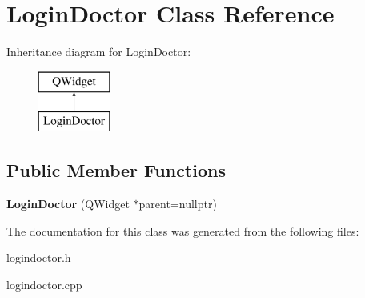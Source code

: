 \hypertarget{class_login_doctor}{}\section{Login\+Doctor Class Reference}
\label{class_login_doctor}
Inheritance diagram for Login\+Doctor\+:\begin{figure}[H]
\begin{center}
\leavevmode
\includegraphics[height=2.000000cm]{class_login_doctor}
\end{center}
\end{figure}
\subsection*{Public Member Functions}
\begin{DoxyCompactItemize}
\item 
\mbox{\label{class_login_doctor_ab1f2131c0149b5a52b6d82fa0763827f}} 
{\bfseries Login\+Doctor} (Q\+Widget $\ast$parent=nullptr)
\end{DoxyCompactItemize}


The documentation for this class was generated from the following files\+:\begin{DoxyCompactItemize}
\item 
logindoctor.\+h\item 
logindoctor.\+cpp\end{DoxyCompactItemize}
